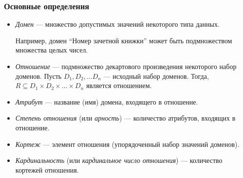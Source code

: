 \begin{frame}

\frametitle{Основные определения}

\begin{itemize}
\item \emph{Домен} --- множество допустимых значений некоторого типа данных.

Например, домен ``Номер зачетной книжки'' может быть подмножеством
множества целых чисел.


\item \emph{Отношение} --- подмножество декартового произведения некоторого
набор доменов. Пусть $D_1, D_2, \dots D_n$ --- исходный набор доменов.
Тогда, $R \subseteq D_1 \times D_2 \times\dots\times D_n$ является
отношением.

\item \emph{Атрибут} --- название (имя) домена, входящего в отношение.

\item \emph{Степень отношения} (или \emph{арность}) --- количество атрибутов,
входящих в отношение.

\item \emph{Кортеж} --- элемент отношения (упорядоченный набор значений доменов).

\item \emph{Кардинальность} (или \emph{кардинальное число отношения}) --- количество
кортежей отношения.
\end{itemize}

\end{frame}

